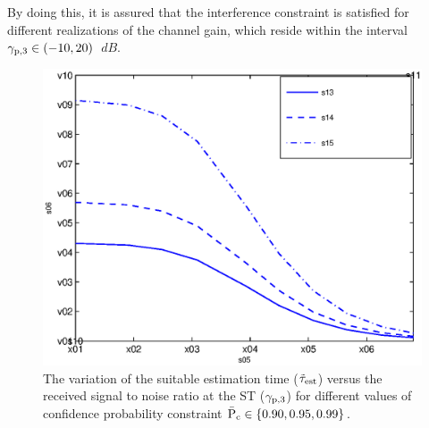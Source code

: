 By doing this, it is assured that the interference constraint is satisfied for different realizations of the channel gain, which reside within the interval ${\gamma}_{\text{p,3}} \in (-10,20)$ $\SI{}{dB}$. 
%	
\begin{figure}
	\centering
	
	\includegraphics[width=\figscale]{figures/test_SNR}
	\caption{The variation of the suitable estimation time ($\tilde{\tau}_{\text{est}}$) versus the received signal to noise ratio at the ST (${\gamma}_{\text{p,3}}$) for different values of confidence probability constraint $\bar{\text{P}}_{\text{c}} \in \{0.90,0.95,0.99 \}$.}
	\label{fig_HVD:Tausnr}
\end{figure}

